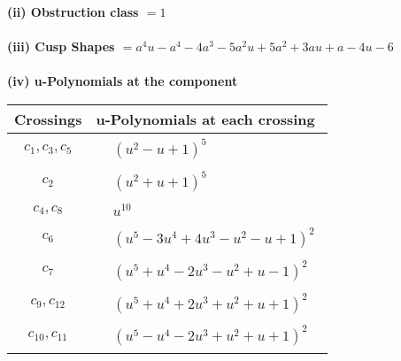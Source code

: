 \documentclass[1p]{elsarticle_modified}
\theoremstyle{definition}
\begin{document}
\flushleft \textbf{(ii) Obstruction class $= 1$}\\~\\
\flushleft \textbf{(iii) Cusp Shapes $= a^4 u- a^4-4 a^3-5 a^2 u+5 a^2+3 a u+a-4 u-6$}\\~\\
\newpage\renewcommand{\arraystretch}{1}
\flushleft \textbf{(iv) u-Polynomials at the component}\newline \\
\begin{tabular}{m{50pt}|m{274pt}}
Crossings & \hspace{64pt}u-Polynomials at each crossing \\
\hline $$\begin{aligned}c_{1},c_{3},c_{5}\end{aligned}$$&$\begin{aligned}
&(u^2- u+1)^5
\end{aligned}$\\
\hline $$\begin{aligned}c_{2}\end{aligned}$$&$\begin{aligned}
&(u^2+u+1)^5
\end{aligned}$\\
\hline $$\begin{aligned}c_{4},c_{8}\end{aligned}$$&$\begin{aligned}
&u^{10}
\end{aligned}$\\
\hline $$\begin{aligned}c_{6}\end{aligned}$$&$\begin{aligned}
&(u^5-3 u^4+4 u^3- u^2- u+1)^2
\end{aligned}$\\
\hline $$\begin{aligned}c_{7}\end{aligned}$$&$\begin{aligned}
&(u^5+u^4-2 u^3- u^2+u-1)^2
\end{aligned}$\\
\hline $$\begin{aligned}c_{9},c_{12}\end{aligned}$$&$\begin{aligned}
&(u^5+u^4+2 u^3+u^2+u+1)^2
\end{aligned}$\\
\hline $$\begin{aligned}c_{10},c_{11}\end{aligned}$$&$\begin{aligned}
&(u^5- u^4-2 u^3+u^2+u+1)^2
\end{aligned}$\\
\hline
\end{tabular}\\~\\
\end{document}
